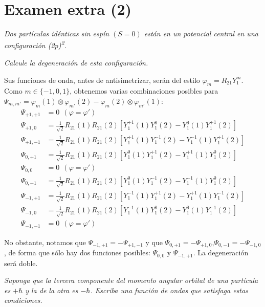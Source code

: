 \chapter{Examen extra (2)}
\begin{tcolorbox}[halign=left]
  \emph{Dos partículas idénticas sin espín $(S=0)$ están en un
    potencial central en una configuración (2p)\textsuperscript{2}.}

  \emph{Calcule la degeneración de esta configuración.}
\end{tcolorbox}
Sus funciones de onda, antes de antisimetrizar, serán del estilo $\varphi_m = R_{21}Y_1^m$. Como $m\in\{-1,0,1\}$, obtenemos varias combinaciones posibles para 
$\Psi_{m,m'} = \varphi_{m}(1)\otimes\varphi_{m'}(2) - \varphi_{m}(2)\otimes\varphi_{m'}(1)$:
\begin{align}
  \Psi_{+1,+1} &= 0 \ \ (\varphi=\varphi') \\
  \Psi_{+1,0} &=\frac{1}{\sqrt{2}} R_{21}(1)R_{21}(2) [Y_1^{+1}(1)Y_1^0(2)-Y_1^{0}(1)Y_1^{+1}(2)] \\
  \Psi_{+1,-1} &=\frac{1}{\sqrt{2}} R_{21}(1)R_{21}(2) [Y_1^{+1}(1)Y_1^{-1}(2)-Y_1^{-1}(1)Y_1^{+1}(2)] \\
  \Psi_{0,+1} &=\frac{1}{\sqrt{2}} R_{21}(1)R_{21}(2) [Y_1^{0}(1)Y_1^{+1}(2)-Y_1^{+1}(1)Y_1^{0}(2)] \\
  \Psi_{0,0} &= 0 \ \ (\varphi=\varphi') \\
  \Psi_{0,-1} &=\frac{1}{\sqrt{2}} R_{21}(1)R_{21}(2) [Y_1^{0}(1)Y_1^{-1}(2)-Y_1^{-1}(1)Y_1^{0}(2)] \\
  \Psi_{-1,+1}&=\frac{1}{\sqrt{2}} R_{21}(1)R_{21}(2) [Y_1^{-1}(1)Y_1^{+1}(2)-Y_1^{+1}(1)Y_1^{-1}(2)] \\
  \Psi_{-1,0} &=\frac{1}{\sqrt{2}} R_{21}(1)R_{21}(2) [Y_1^{-1}(1)Y_1^0(2)-Y_1^{0}(1)Y_1^{-1}(2)] \\
  \Psi_{-1,-1} &= 0 \ \ (\varphi=\varphi') 
\end{align}

No obstante, notamos que $\Psi_{-1,+1}= -\Psi_{+1,-1}$ y que $\Psi_{0,+1}= -\Psi_{+1,0}$,$\Psi_{0,-1}= -\Psi_{-1,0}$, de forma que sólo hay dos funciones posibles: $\Psi_{0,0}$ y $\Psi_{-1,+1}$. La degeneración será doble.


\begin{tcolorbox}[halign=left]
  \emph{Suponga que la tercera componente del momento angular orbital
    de una partícula es $+\hbar$ y la de la otra es $-\hbar$. Escriba
    una función de ondas que satisfaga estas condiciones.}
\end{tcolorbox}

